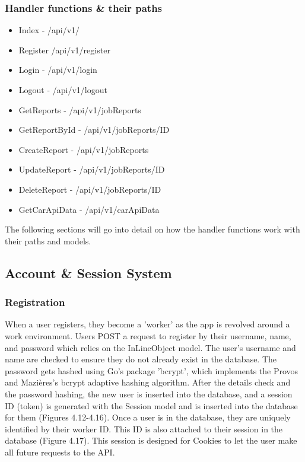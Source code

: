 \subsubsection{Handler functions \& their paths}
\begin{itemize}
    \item Index - /api/v1/
    \item Register /api/v1/register
    \item Login - /api/v1/login
     \item Logout - /api/v1/logout
    \item GetReports - /api/v1/jobReports
    \item GetReportById - /api/v1/jobReports/ID
    \item CreateReport - /api/v1/jobReports
    \item UpdateReport - /api/v1/jobReports/ID
    \item DeleteReport - /api/v1/jobReports/ID
    \item GetCarApiData - /api/v1/carApiData
\end{itemize}

The following sections will go into detail on how the handler functions work with their paths and models.

\subsection{Account \& Session System}
\subsubsection{Registration}
When a user registers, they become a 'worker' as the app is revolved around a work environment. Users POST a request to register by their username, name, and password which relies on the InLineObject model. The user's username and name are checked to ensure they do not already exist in the database. The password gets hashed using Go's package 'bcrypt', which implements the Provos and Mazières's bcrypt adaptive hashing algorithm. \cite{ref15} After the details check and the password hashing, the new user is inserted into the database, and a session ID (token) is generated with the Session model and is inserted into the database for them (Figures 4.12-4.16). Once a user is in the database, they are uniquely identified by their worker ID. This ID is also attached to their session in the database (Figure 4.17). This session is designed for Cookies to let the user make all future requests to the API.

